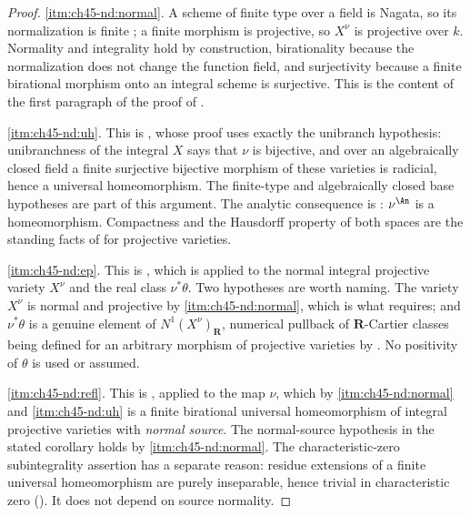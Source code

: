 \begin{proof}
\cref{itm:ch45-nd:normal}.  A scheme of finite type over a field is Nagata,
so its normalization is finite
\cite[\href{https://stacks.math.columbia.edu/tag/035S}{Tag 035S}]
{stacks-project}; a finite morphism is projective, so $X^\nu$ is projective
over $k$.  Normality and integrality hold by construction, birationality
because the normalization does not change the function field, and
surjectivity because a finite birational morphism onto an integral scheme is
surjective.  This is the content of the first paragraph of the proof of
.

\cref{itm:ch45-nd:uh}.  This is
, whose proof uses exactly the
unibranch hypothesis: unibranchness of the integral $X$ says that $\nu$
is bijective, and over an algebraically closed field a finite surjective
bijective morphism of these varieties is radicial, hence a universal
homeomorphism.  The finite-type and algebraically closed base hypotheses
are part of this argument.  The
analytic consequence is
: $\nu^{\An}$ is a
homeomorphism.  Compactness and the Hausdorff property of both spaces are
the standing facts of  for projective
varieties.

\cref{itm:ch45-nd:ep}.  This is , which
is  applied to the normal integral projective
variety $X^\nu$ and the real class $\nu^*\theta$.  Two hypotheses are
worth naming.  The variety $X^\nu$ is normal and projective by
\cref{itm:ch45-nd:normal}, which is what 
requires; and $\nu^*\theta$ is a genuine element of
$N^1(X^\nu)_{\mathbf R}$, numerical pullback of $\mathbf R$-Cartier
classes being defined for an arbitrary morphism of projective varieties by
.  No positivity of $\theta$ is used or assumed.

\cref{itm:ch45-nd:refl}.  This is
, applied to the map
$\nu$, which by \cref{itm:ch45-nd:normal} and \cref{itm:ch45-nd:uh} is a
finite birational universal homeomorphism of integral projective varieties
with \emph{normal source}.  The normal-source hypothesis in the stated
corollary holds by \cref{itm:ch45-nd:normal}.
The characteristic-zero subintegrality assertion has a separate reason:
residue extensions of a finite universal homeomorphism are purely
inseparable, hence trivial in characteristic zero
().
It does not depend on source normality.
\end{proof}

